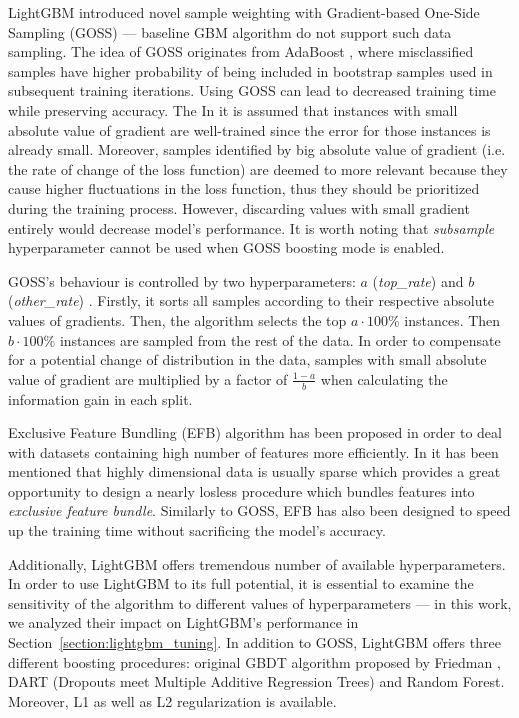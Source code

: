 \documentclass[magisterska, english]{pwr_wmat_praca_dyplomowa}
\theoremstyle{plain}
\numberwithin{theorem}{chapter}
\theoremstyle{definition}
\numberwithin{theorem}{chapter}
\begin{document}
LightGBM introduced novel sample weighting with Gradient-based One-Side Sampling (GOSS) --- baseline GBM algorithm \cite{friedman_gbm} do not support such data sampling. The idea of GOSS originates from AdaBoost \cite{adaboost}, where misclassified samples have higher probability of being included in bootstrap samples used in subsequent training iterations. Using GOSS can lead to decreased training time while preserving accuracy. The  In \cite{lightgbm} it is assumed that instances with small absolute value of gradient are well-trained since the error for those instances is already small. Moreover, samples identified by big absolute value of gradient (i.e. the rate of change of the loss function) are deemed to more relevant because they cause higher fluctuations in the loss function, thus they should be prioritized during the training process. However, discarding values with small gradient entirely would decrease model's performance. It is worth noting that \emph{subsample} hyperparameter cannot be used when GOSS boosting mode is enabled.

GOSS's behaviour is controlled by two hyperparameters: $a$ (\emph{top\_rate}) and $b$ (\emph{other\_rate}) \cite{lightgbm}. Firstly, it sorts all samples according to their respective absolute values of gradients. Then, the algorithm selects the top $a\cdot 100\%$ instances. Then $b\cdot 100\%$ instances are sampled from the rest of the data. In order to compensate for a potential change of distribution in the data, samples with small absolute value of gradient are multiplied by a factor of $\frac{1-a}{b}$ when calculating the information gain in each split. 

Exclusive Feature Bundling (EFB) algorithm has been proposed in order to deal with datasets containing high number of features more efficiently. In \cite{lightgbm} it has been mentioned that highly dimensional data is usually sparse which provides a great opportunity to design a nearly losless procedure which bundles features into \emph{exclusive feature bundle}. Similarly to GOSS, EFB has also been designed to speed up the training time without sacrificing the model's accuracy. 

Additionally, LightGBM offers tremendous number of available hyperparameters. In order to use LightGBM to its full potential, it is essential to examine the sensitivity of the algorithm to different values of hyperparameters --- in this work, we analyzed their impact on LightGBM's performance in Section~\ref{section:lightgbm_tuning}. In addition to GOSS, LightGBM offers three different boosting procedures: original GBDT algorithm proposed by Friedman \cite{friedman_gbm}, DART (Dropouts meet Multiple Additive Regression Trees) and Random Forest. Moreover, L1 as well as L2 regularization is available.
\end{document}
